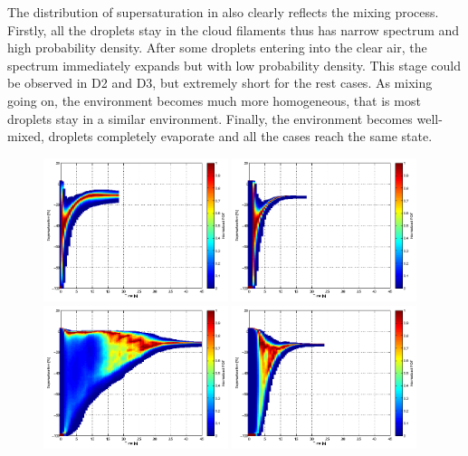 \documentclass[12pt]{article}
\begin{document}
The distribution of supersaturation in  also clearly reflects the mixing process. Firstly, all the droplets stay in the cloud filaments thus has narrow spectrum and high probability density. After some droplets entering into the clear air, the spectrum immediately expands but with low probability density. This stage could be observed in D2 and D3, but extremely short for the rest cases. As mixing going on, the environment becomes much more homogeneous, that is most droplets stay in a similar environment. Finally, the environment becomes well-mixed, droplets completely evaporate and all the cases reach the same state.
\begin{figure}[H]
\includegraphics[width=0.48\textwidth]{Figures/pdf_supersat_d1}
\includegraphics[width=0.48\textwidth]{Figures/pdf_supersat_f1}\\
\includegraphics[width=0.48\textwidth]{Figures/pdf_supersat_d2}
\includegraphics[width=0.48\textwidth]{Figures/pdf_supersat_f2}\\

\end{figure}
\end{document}
